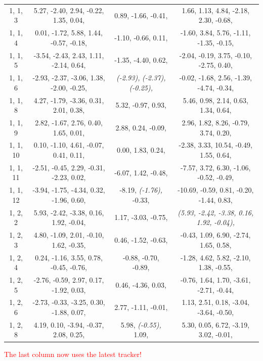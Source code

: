 \documentclass[compress]{beamer}
\begin{document}
\begin{frame}
{\begin{tabular}{c c c c}
1, 1, 3 &  5.27,   -2.40,   2.94,   -0.22,   1.35,   0.04,  &  0.89,   -1.66,   -0.41,  &  1.66,   1.13,   4.84,   -2.18,   2.30,   -0.68,  \\
1, 1, 4 &  0.01,   -1.72,   5.88,   1.44,   -0.57,   -0.18,  &  -1.10,   -0.66,   0.11,  &  -1.60,   3.84,   5.76,   -1.11,   -1.35,   -0.15,  \\
1, 1, 5 &  -3.54,   -2.43,   2.43,   1.11,   -2.14,   0.64,  &  -1.35,   -4.40,   0.62,  &  -2.04,   -0.19,   3.75,   -0.10,   -2.75,   0.40,  \\
1, 1, 6 &  -2.93,   -2.37,   -3.06,   1.38,   -2.00,   -0.25,  &  {\it (-2.93),}   {\it (-2.37),}   {\it (-0.25),}  &  -0.02,   -1.68,   2.56,   -1.39,   -4.74,   -0.34,  \\
1, 1, 8 &  4.27,   -1.79,   -3.36,   0.31,   2.01,   0.38,  &  5.32,   -0.97,   0.93,  &  5.46,   0.98,   2.14,   0.63,   1.34,   0.64,  \\
1, 1, 9 &  2.82,   -1.67,   2.76,   0.40,   1.65,   0.01,  &  2.88,   0.24,   -0.09,  &  2.96,   1.82,   8.26,   -0.79,   3.74,   0.20,  \\
1, 1, 10 &  0.10,   -1.10,   4.61,   -0.07,   0.41,   0.11,  &  0.00,   1.83,   0.24,  &  -2.38,   3.33,   10.54,   -0.49,   1.55,   0.64,  \\
1, 1, 11 &  -2.51,   -0.45,   2.29,   -0.31,   -2.23,   0.02,  &  -6.07,   1.42,   -0.48,  &  -7.57,   3.72,   6.30,   -1.06,   -0.52,   -0.49,  \\
1, 1, 12 &  -3.94,   -1.75,   -4.34,   0.32,   -1.96,   0.60,  &  -8.19,   {\it (-1.76),}   -0.33,  &  -10.69,   -0.59,   0.81,   -0.20,   -1.44,   0.83,  \\
1, 2, 2 &  5.93,   -2.42,   -3.38,   0.16,   1.92,   -0.04,  &  1.17,   -3.03,   -0.75,  &  {\it (5.93,}   {\it -2.42,}   {\it -3.38,}   {\it 0.16,}   {\it 1.92,}   {\it -0.04),}  \\
1, 2, 3 &  4.80,   -1.09,   2.01,   -0.10,   1.62,   -0.35,  &  0.46,   -1.52,   -0.63,  &  -0.43,   1.09,   6.90,   -2.74,   1.65,   0.58,  \\
1, 2, 4 &  0.24,   -1.16,   3.55,   0.78,   -0.45,   -0.76,  &  -0.88,   -0.70,   -0.89,  &  -1.28,   4.62,   5.82,   -2.10,   1.38,   -0.55,  \\
1, 2, 5 &  -2.76,   -0.59,   2.97,   0.17,   -1.92,   0.03,  &  0.46,   -4.36,   0.03,  &  -0.76,   1.64,   1.70,   -3.61,   -2.71,   -0.44,  \\
1, 2, 6 &  -2.73,   -0.33,   -3.25,   0.30,   -1.88,   0.07,  &  2.77,   -1.11,   -0.01,  &  1.13,   2.51,   0.18,   -3.04,   -3.64,   -0.50,  \\
1, 2, 8 &  4.19,   0.10,   -3.94,   -0.37,   2.08,   0.25,  &  5.98,   {\it (-0.55),}   1.09,  &  5.30,   0.05,   6.72,   -3.19,   3.02,   -0.01,  \\
\end{tabular}}

\vfill \tiny \textcolor{red}{The last column now uses the latest tracker!}
\end{frame}
\end{document}
